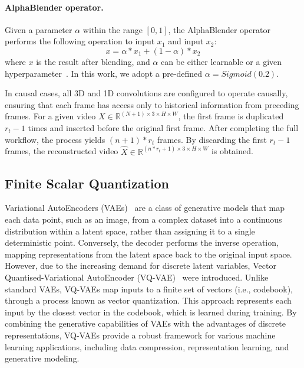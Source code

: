 \documentclass{article} %
\begin{document}
\paragraph{AlphaBlender operator.}
Given a parameter $\alpha$ within the range $[0,1]$, the AlphaBlender operator performs the following operation to input $x_1$ and input $x_2$:
\begin{equation}
    \label{equ:alphablender}
        x = \alpha * x_1 + (1-\alpha) * x_2
\end{equation}
where $x$ is the result after blending, and $\alpha$ can be either learnable or a given hyperparameter~\citep{repoopensoraplan}. In this work, we adopt a pre-defined $\alpha=Sigmoid(0.2)$.

In causal cases, all 3D and 1D convolutions are configured to operate causally, ensuring that each frame has access only to historical information from preceding frames. For a given video $X \in \mathbb{R} ^{(N+1) \times 3 \times H \times W}$, the first frame is duplicated $r_t - 1$ times and inserted before the original first frame. After completing the full workflow, the process yields $(n+1)*r_t$ frames. By discarding the first $r_t - 1$ frames, the reconstructed video $\hat{X} \in \mathbb{R} ^{(n*r_t+1) \times 3 \times H \times W}$ is obtained.

\subsection{Finite Scalar Quantization}
\label{sec:fsq}

Variational AutoEncoders (VAEs)~\citep{Kingma2014} are a class of generative models that map each data point, such as an image, from a complex dataset into a continuous distribution within a latent space, rather than assigning it to a single deterministic point. Conversely, the decoder performs the inverse operation, mapping representations from the latent space back to the original input space. However, due to the increasing demand for discrete latent variables, Vector Quantised-Variational AutoEncoder (VQ-VAE)~\citep{van2017neuralvqvae} were introduced. Unlike standard VAEs, VQ-VAEs map inputs to a finite set of vectors (i.e., codebook), through a process known as vector quantization. This approach represents each input by the closest vector in the codebook, which is learned during training. By combining the generative capabilities of VAEs with the advantages of discrete representations, VQ-VAEs provide a robust framework for various machine learning applications, including data compression, representation learning, and generative modeling.
\end{document}
